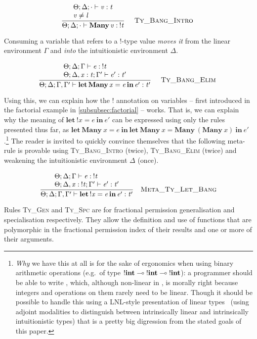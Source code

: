 \vspace{-\baselineskip}
\[
    {\displaystyle\frac{\begin{array}{l} \Theta ; \Delta ; \cdot \vdash \mathit{v} : \mathit{t} \\ \mathit{v} \neq \mathit{l} \\ \end{array}}{ \Theta ; \Delta ; \cdot \vdash \mathbf{Many} \, \mathit{v} : \: ! \mathit{t}}\quad\textsc{ {\textsc{Ty\_Bang\_Intro}}{} }}
\]

Consuming a variable that refers to a !-type value \emph{moves it} from the
linear environment $\Gamma$ and \emph{into} the intuitionistic environment
$\Delta$.

\vspace{-\baselineskip}
\[
    {\displaystyle\frac{\begin{array}{l} \Theta ; \Delta ; \Gamma \vdash \mathit{e} : \: ! \mathit{t} \\ \Theta ; \Delta , \mathit{x} : \mathit{t} ; \Gamma' \vdash \mathit{e'} : \mathit{t'} \\ \end{array}}{ \Theta ; \Delta ; \Gamma , \Gamma' \vdash \mathbf{let} \, \mathbf{Many} \, \mathit{x} = \mathit{e} \, \mathbf{in} \, \mathit{e'} : \mathit{t'}}\quad\textsc{ {\textsc{Ty\_Bang\_Elim}}{} }}
\]

Using this, we can explain how the ! annotation on variables -- first
introduced in the factorial example in \ref{subsubsec:factorial} -- works. That
is, we can explain why the meaning of $\mathbf{let}\ !x = e\ \mathbf{in}\ e'$
can be expressed using only the rules presented thus far, as $\mathbf{let\
Many}\ x = e\ \mathbf{in\ } \mathbf{let\ Many}\ x = \mathbf{Many}\
(\mathbf{Many}\ x)\ \mathbf{in}\ e'$.\footnote{\emph{Why} we have this at all
    is for the sake of ergonomics when using binary arithmetic operations
    (e.g.\ of type $!\mathbf{int} \multimap \; !\mathbf{int} \multimap \;
    !\mathbf{int}$): a programmer should be able to write \highl{let x = 5 + 5
    in x - x}, which, although non-linear in \highl{x}, is morally right
    because integers and operations on them rarely need to be linear. Though it
    should be possible to handle this using a LNL-style presentation of linear
    types~\cite{benton1995} (using adjoint modalities to distinguish between
    intrinsically linear and intrinsically intuitionistic types) that is a
    pretty big digression from the stated goals of this paper.}
The reader is invited to quickly convince themselves that the following
meta-rule is provable using \textsc{Ty\_Bang\_Intro} (twice),
\textsc{Ty\_Bang\_Elim} (twice) and weakening the intuitionistic environment
$\Delta$ (once).

\vspace{-\baselineskip}
\[
\ottdrule{%
\ottpremise{\Theta  \ottsym{;}  \Delta  \ottsym{;}  \Gamma  \vdash  \ottnt{e}  \ottsym{:}  \: !  \ottnt{t}}%
\ottpremise{\Theta  \ottsym{;}  \Delta  \ottsym{,}  \mathit{x}  \ottsym{:}  \: !  \ottnt{t}  \ottsym{;}  \Gamma'  \vdash  \ottnt{e'}  \ottsym{:}  \ottnt{t'}}%
}{
\Theta  \ottsym{;}  \Delta  \ottsym{;}  \Gamma  \ottsym{,}  \Gamma'  \vdash  \ottkw{let} \, ! \mathit{x} \ottsym{=} \ottnt{e} \, \ottkw{in} \, \ottnt{e'}  \ottsym{:}  \ottnt{t'}}{%
{\ottdrulename{Meta\_Ty\_Let\_Bang}}{}%
}
\]

Rules \textsc{Ty\_Gen} and \textsc{Ty\_Spc} are for fractional permission
generalisation and specialisation respectively. They allow the definition and
use of functions that are polymorphic in the fractional permission index of
their results and one or more of their arguments.

